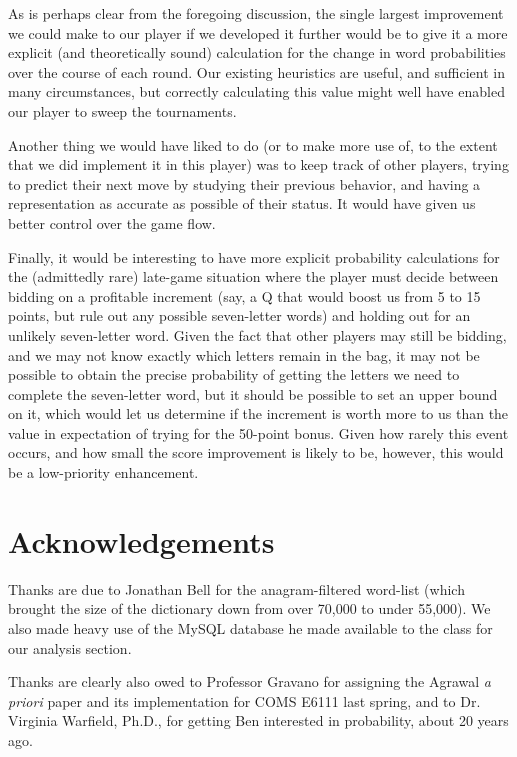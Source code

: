 \documentclass[11pt]{article}
\begin{document}
As is perhaps clear from the foregoing discussion, the single largest improvement we could make to our player if we developed it further would be to give it a more explicit (and theoretically sound) calculation for the change in word probabilities over the course of each round.  Our existing heuristics are useful, and sufficient in many circumstances, but correctly calculating this value might well have enabled our player to sweep the tournaments.

Another thing we would have liked to do (or to make more use of, to the extent that we did implement it in this player) was to keep track of other players, trying to predict their next move by studying their previous behavior, and having a representation as accurate as possible of their status. It would have given us better control over the game flow.

Finally, it would be interesting to have more explicit probability calculations for the (admittedly rare) late-game situation where the player must decide between bidding on a profitable increment (say, a Q that would boost us from 5 to 15 points, but rule out any possible seven-letter words) and holding out for an unlikely seven-letter word. Given the fact that other players may still be bidding, and we may not know exactly which letters remain in the bag, it may not be possible to obtain the precise probability of getting the letters we need to complete the seven-letter word, but it should be possible to set an upper bound on it, which would let us determine if the increment is worth more to us than the value in expectation of trying for the 50-point bonus.  Given how rarely this event occurs, and how small the score improvement is likely to be, however, this would be a low-priority enhancement.



\section{Acknowledgements}

Thanks are due to Jonathan Bell for the anagram-filtered word-list (which brought the size of the dictionary down from over 70,000 to under 55,000).  We also made heavy use of the MySQL database he made available to the class for our analysis section.

Thanks are clearly also owed to Professor Gravano for assigning the Agrawal {\it a priori} paper and its implementation for COMS E6111 last spring, and to Dr. Virginia Warfield, Ph.D., for getting Ben interested in probability, about 20 years ago.
\end{document}
